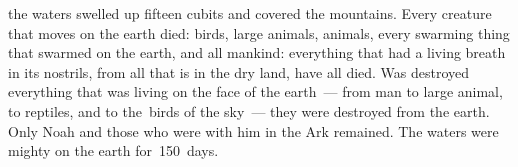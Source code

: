 \begin{inparaenum}
   the waters swelled up fifteen cubits and covered the mountains.%
   Every creature that moves on the earth died: birds, large animals, animals, every swarming thing that swarmed on the earth, and all mankind:%
   everything that had a living breath in its nostrils, from all that is in the dry land, have all died.%
   Was destroyed everything that was living on the face of the earth~--- from man to large animal, to reptiles, and to the\understood\ birds of the sky~--- they were destroyed from the earth. Only Noah and those who were with him in the Ark remained.%
   The waters were mighty on the earth for\understood\ 150~days.%
\end{inparaenum}
